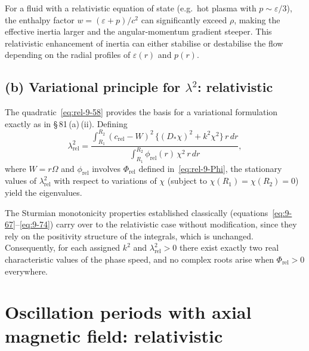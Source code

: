 \medskip
For a fluid with a relativistic equation of state (e.g.\ hot plasma
with $p\sim\varepsilon/3$), the enthalpy factor $w = (\varepsilon+p)/c^{2}$
can significantly exceed $\rho$, making the effective inertia larger
and the angular-momentum gradient steeper.  This relativistic
enhancement of inertia can either stabilise or destabilise the flow
depending on the radial profiles of $\varepsilon(r)$ and $p(r)$.

\subsection*{(b) Variational principle for $\lambda^{2}$: relativistic}
\label{sec:rel-81b}

The quadratic~\eqref{eq:rel-9-58} provides the basis for a variational
formulation exactly as in \S\,81\,(a)\,(ii).  Defining
\begin{equation}
  \lambda_{\mathrm{rel}}^{2}
  = \frac{\displaystyle\int_{R_{1}}^{R_{2}}
      (c_{\mathrm{rel}} - W)^{2}\,
      \bigl\{(D_{*}\chi)^{2} + k^{2}\chi^{2}\bigr\}\,r\,dr}
    {\displaystyle\int_{R_{1}}^{R_{2}}
      \phi_{\mathrm{rel}}(r)\,\chi^{2}\,r\,dr},
  \label{eq:rel-9-66}
\end{equation}
where $W = r\Omega$ and $\phi_{\mathrm{rel}}$ involves
$\Phi_{\mathrm{rel}}$ defined in~\eqref{eq:rel-9-Phi}, the stationary
values of $\lambda_{\mathrm{rel}}^{2}$ with respect to variations of
$\chi$ (subject to $\chi(R_{1})=\chi(R_{2})=0$) yield the eigenvalues.

The Sturmian monotonicity properties established classically
(equations~\eqref{eq:9-67}--\eqref{eq:9-74}) carry over to the
relativistic case without modification, since they rely on the
positivity structure of the integrals, which is unchanged.
Consequently, for each assigned $k^{2}$ and $\lambda_{\mathrm{rel}}^{2}>0$
there exist exactly two real characteristic values of the phase speed,
and no complex roots arise when $\Phi_{\mathrm{rel}}>0$ everywhere.

\section{Oscillation periods with axial magnetic field: relativistic}
\label{sec:rel-82}

